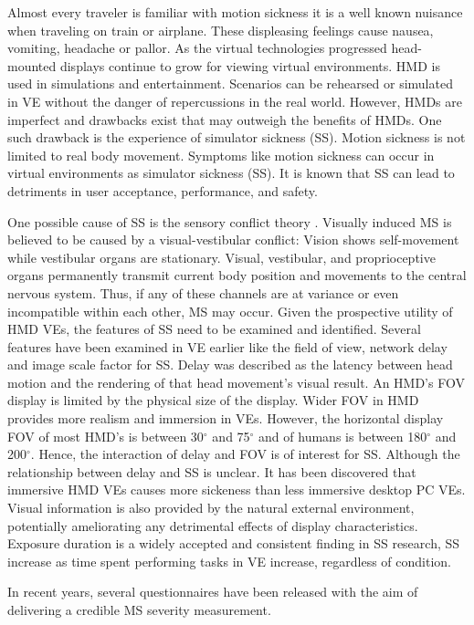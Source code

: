 Almost every traveler is familiar with motion sickness it is a well known nuisance when traveling on train or airplane. These displeasing feelings cause nausea, vomiting, headache or pallor. As the virtual technologies progressed head-mounted displays continue to grow for viewing virtual environments. HMD is used in simulations and entertainment. Scenarios can be rehearsed or simulated in VE without the danger of repercussions in the real world. However, HMDs are imperfect and drawbacks exist that may outweigh the benefits of HMDs. One such drawback is the experience of simulator sickness (SS). Motion sickness is not limited to real body movement. Symptoms like motion sickness can occur in virtual environments as simulator sickness (SS). It is known that SS can lead to detriments in user acceptance, performance, and safety.\cite{moss2011characteristics} \par 
One possible cause of SS is the sensory conflict theory \cite{reason1975motion}. Visually induced MS is believed to be caused by a visual-vestibular conflict: Vision shows self-movement while vestibular organs are stationary. Visual, vestibular, and proprioceptive organs permanently transmit current body position and movements to the central nervous system. Thus, if any of these channels are at variance or even incompatible within each other, MS may occur. Given the prospective utility of HMD VEs, the features of SS need to be examined and identified. Several features have been examined in VE earlier like the field of view, network delay and image scale factor for SS. Delay was described as the latency between head motion and the rendering of that head movement's visual result. An HMD's FOV display is limited by the physical size of the display. Wider FOV in HMD provides more realism and immersion in VEs. However, the horizontal display FOV of most HMD's is between 30$^{\circ}$ and 75$^{\circ}$ and of humans is between 180$^{\circ}$ and 200$^{\circ}$\cite{toet2007effects}. Hence, the interaction of delay and FOV is of interest for SS. Although the relationship between delay and SS is unclear. It has been discovered that immersive HMD VEs causes more sickeness than less immersive desktop PC VEs\cite{sharples2008virtual}. Visual information is also provided by the natural external environment, potentially ameliorating any detrimental effects of display characteristics. Exposure duration is a widely accepted and consistent finding in SS research, SS increase as time spent performing tasks in VE increase, regardless of condition\cite{kennedy2000duration}.\par In recent years, several questionnaires have been released with the aim of delivering a credible MS severity measurement.
